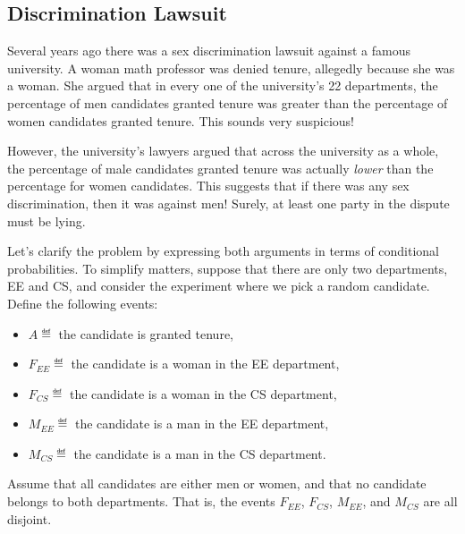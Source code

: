 \iffalse

A counterexample is shown in Figure~\ref{fig:15D2}.  In this case,
$\prcond{A}{B} = 1/2$, $\prcond{A}{C} = 1/2$, $\prcond{A}{B \intersect
  C} = 1$, and $\prcond{A}{B \union C} = 1/3$.  However, since
$1/3 \ne 1/2 + 1/2 - 1$, equation~\eqref{LN12:fc} does not hold.
%
\begin{figure}

\graphic{cx19}

\caption{A counterexample to equation~\eqref{LN12:fc}.  Event~$A$ is
  the dark-bordered rectangle, event~$B$ is the rectangle with
  vertical stripes, and event~$C$ is the rectangle with horizontal
  stripes.  $B \intersect C$ lies entirely within~$A$ while $B - C$
  and $C - B$ are entirely outside of~$A$.}

\label{fig:15D2}

\end{figure}
\fi


\subsection{Discrimination Lawsuit}\label{discrimination_subsec}

Several years ago there was a sex discrimination lawsuit against a
famous university.  A woman math professor was denied tenure,
allegedly because she was a woman.  She argued that in every one of
the university's 22 departments, the percentage of men candidates
granted tenure was greater than the percentage of women candidates
granted tenure.  This sounds very suspicious!

However, the university's lawyers argued that across the university as
a whole, the percentage of male candidates granted tenure was actually
\emph{lower} than the percentage for women candidates.  This suggests
that if there was any sex discrimination, then it was against men!
Surely, at least one party in the dispute must be lying.

Let's clarify the problem by expressing both arguments in terms of
conditional probabilities.  To simplify matters, suppose that there
are only two departments, EE and CS, and consider the experiment where
we pick a random candidate.  Define the following events:
%
\begin{itemize}
\item $A \eqdef$ the candidate is granted tenure,
\item $F_{EE} \eqdef$ the candidate is a woman in the EE department,
\item $F_{CS} \eqdef$ the candidate is a woman in the CS department,
\item $M_{EE} \eqdef$ the candidate is a man in the EE department,
\item $M_{CS} \eqdef$ the candidate is a man in the CS department.
\end{itemize}
Assume that all candidates are either men or women, and that no
candidate belongs to both departments.  That is, the events $F_{EE}$,
$F_{CS}$, $M_{EE}$, and $M_{CS}$ are all disjoint.

